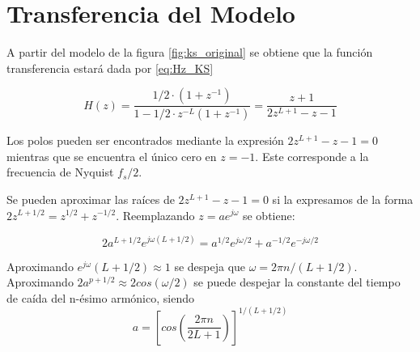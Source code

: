 \section{Transferencia del Modelo}

A partir del modelo de la figura \ref{fig:ks_original} se obtiene que la función transferencia estará dada por \eqref{eq:Hz_KS}

\begin{equation}
    H(z) = \frac{1/2\cdot (1+z^{-1})}{1-1/2\cdot z^{-L}(1+z^{-1})}= \frac{z+1}{2z^{L+1}-z-1}
    \label{eq:Hz_KS}
\end{equation}

Los polos pueden ser encontrados mediante la expresión $2z^{L+1}-z-1 = 0$ mientras que se encuentra el único cero en $z=-1$. Este corresponde a la frecuencia de Nyquist $f_s/2$.

Se pueden aproximar las raíces de $2z^{L+1}-z-1 = 0$ si la expresamos de la forma $2z^{L+1/2} = z^{1/2} + z^{-1/2}$. Reemplazando $z=a e^{j\omega}$ se obtiene:

\begin{equation}
    2 a^{L+1/2} e^{j\omega (L+1/2)} = a^{1/2}e^{j\omega/2} + a^{-1/2}e^{-j\omega/2}
\end{equation}

Aproximando $e^{j\omega}(L+1/2) \approx 1$ se despeja que $\omega = 2 \pi n / (L+1/2)$. Aproximando $2 a^{p+1/2}\approx 2 cos(\omega/2)$ se puede despejar la constante del tiempo de caída del n-ésimo armónico, siendo
\begin{equation}
    a=\left[cos\left( \frac{2 \pi n}{2L+1}\right)\right]^{1/(L+1/2)}
\end{equation}